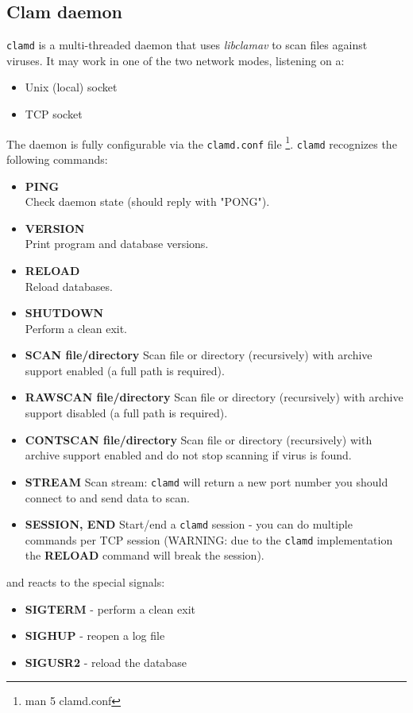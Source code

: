 \documentclass[a4paper,titlepage,12pt]{article}
\begin{document}
    \subsection{Clam daemon}\label{clamd}
    \verb+clamd+ is a multi-threaded daemon that uses \emph{libclamav}
    to scan files against viruses. It may work in one of the two network modes,
    listening on a:
    \begin{itemize}
	\item Unix (local) socket
	\item TCP socket
    \end{itemize}
    The daemon is fully configurable via the \verb+clamd.conf+ file
    \footnote{man 5 clamd.conf}. \verb+clamd+ recognizes the following commands:
    \begin{itemize}
	\item \textbf{PING}\\
	    Check daemon state (should reply with "PONG").
	\item \textbf{VERSION}\\
	    Print program and database versions.
	\item \textbf{RELOAD}\\
	    Reload databases.
	\item \textbf{SHUTDOWN}\\
	    Perform a clean exit.
	\item \textbf{SCAN file/directory}
	    Scan file or directory (recursively) with archive support
	    enabled (a full path is required).
	\item \textbf{RAWSCAN file/directory}
	    Scan file or directory (recursively) with archive support
	    disabled (a full path is required).
	\item \textbf{CONTSCAN file/directory}
	    Scan file or directory (recursively) with archive support
	    enabled and do not stop scanning if virus is found.
	\item \textbf{STREAM}
	    Scan stream: \verb+clamd+ will return a new port number you should
	    connect to and send data to scan.
	\item \textbf{SESSION, END}
	    Start/end a \verb+clamd+ session - you can do multiple commands
	    per TCP session (WARNING: due to the \verb+clamd+ implementation the
	    \textbf{RELOAD} command will break the session).
    \end{itemize}
    and reacts to the special signals:
    \begin{itemize}
	\item \textbf{SIGTERM} - perform a clean exit
	\item \textbf{SIGHUP} - reopen a log file
	\item \textbf{SIGUSR2} - reload the database
    \end{itemize}
\end{document}
